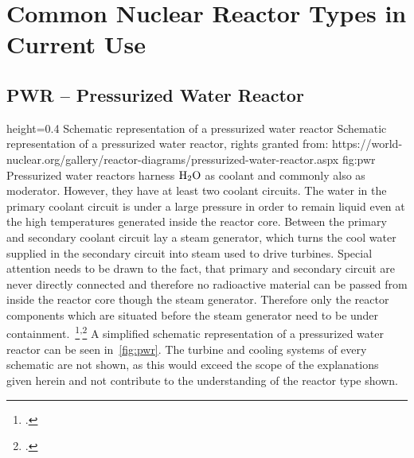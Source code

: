 \chapter{Common Nuclear Reactor Types in Current Use} 
\section{PWR – Pressurized Water Reactor}
    {height=0.4\textheight}
    {Schematic representation of a pressurized water reactor}
    {Schematic representation of a pressurized water reactor, rights granted from: https://world-nuclear.org/gallery/reactor-diagrams/pressurized-water-reactor.aspx}
    {fig:pwr}
Pressurized water reactors harness $\ce{H_{2}O}$ as coolant and commonly also as moderator. However, they have at least
two coolant circuits. The water in the primary coolant circuit is under a large pressure in order
to remain liquid even at the high temperatures generated inside the reactor core. Between the primary
and secondary coolant circuit lay a steam generator, which turns the cool water supplied in the secondary circuit
into steam used to drive turbines. Special attention needs to be drawn to the fact, that primary and secondary
circuit are never directly connected and therefore no radioactive material can be passed from inside the reactor core
though the steam generator. Therefore only the reactor components which are situated before the steam generator
need to be under containment.~\footcite{WNPR}\textsuperscript{,}\footcite[14-84]{engHandbook} 
A simplified schematic representation of a pressurized water reactor can be seen in~\ref{fig:pwr}. The
turbine and cooling systems of every schematic are not shown, as this would exceed the scope of the
explanations given herein and not contribute to the understanding of the reactor type shown.
\pagebreak

